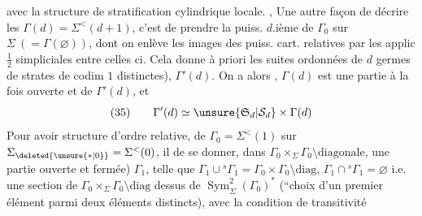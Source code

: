 avec la structure de stratification cylindrique 
locale. , Une autre façon de
décrire les $\Gamma(d)=\Sigma^{<}(d+1)$, c'est de
prendre la puiss.   $d$.ième de $\Gamma_0$\deleted{\unsure{$(\varnothing)$}}
sur $\Sigma\ (=\Gamma(\varnothing))$, dont on enlève les images
des puiss. cart. relatives   par les applic
$\tfrac12$ simpliciales entre celles ci. Cela donne à priori
les  suites ordonnées de $d$ germes de
strates de codim $1$   distinctes), 
$\Gamma'(d)$. On a alors ,
$\Gamma(d)$ est une partie à la fois ouverte et
 de $\Gamma'(d)$, et 
\[
(35)\qquad \Gamma'(d)\simeq\unsure{\mathfrak S_d|\mathcal S_d}\times\Gamma(d)
\]
Pour avoir  structure d'ordre  relative, de
 $\Gamma_0=\Sigma^{<}(1)$ sur $\Sigma_{\deleted{\unsure{*|0}}}=\Sigma^{<}(0)$, il 
de se donner,  dans
$\Gamma_0\times_\Sigma\Gamma_0\setminus\text{diagonale}$, une partie  ouverte et fermée)
$\Gamma_1$, telle que $\Gamma_1\cup{}^s\Gamma_1=\Gamma_0\times\Gamma_0\setminus\text{diag}$, $\Gamma_1\cap{}^s\Gamma_1=\varnothing$
i.e. une section de $\Gamma_0\times_\Sigma\Gamma_0\setminus\text{diag}$  dessus
de $\operatorname{Sym}^2_\Sigma(\Gamma_0)^*$ (``choix d'un premier élément parmi deux
éléments distincts), avec la condition de transitivité

